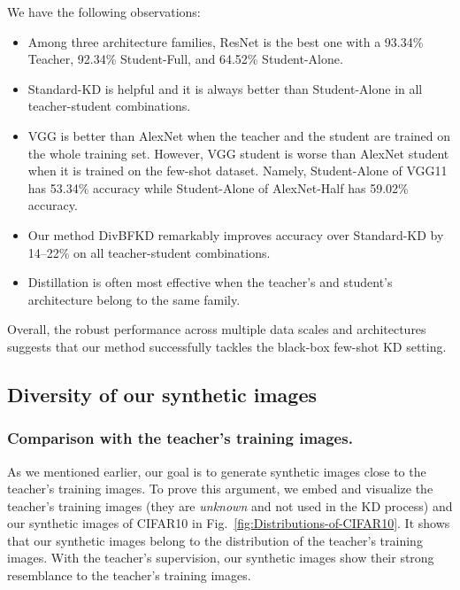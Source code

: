 \documentclass[12pt, a4paper, twoside]{book}
\numberwithin{equation}{chapter}
\theoremstyle{plain}
\theoremstyle{definition}
\theoremstyle{remark}
\newenvironment{foldable}{}{}
\begin{document}
\begin{foldable}
  We have the following observations:
  \begin{itemize}
    \item Among three architecture families, ResNet is the best one with a 93.34\% Teacher, 92.34\% Student-Full, and 64.52\% Student-Alone.
    \item Standard-KD is helpful and it is always better than Student-Alone in all teacher-student combinations.
    \item {
        VGG is better than AlexNet when the teacher and the student are trained on the whole training set.
        However, VGG student is worse than AlexNet student when it is trained on the few-shot dataset.
        Namely, Student-Alone of VGG11 has 53.34\% accuracy while Student-Alone of AlexNet-Half has 59.02\% accuracy.
      }
    \item Our method DivBFKD remarkably improves accuracy over Standard-KD by 14--22\% on all teacher-student combinations.
    \item Distillation is often most effective when the teacher's and student's architecture belong to the same family.
  \end{itemize}
  Overall, the robust performance across multiple data scales and architectures suggests that our method successfully tackles the black-box few-shot \ac{KD} setting.
\end{foldable}

\subsection{Diversity of our synthetic images}

\subsubsection{Comparison with the teacher's training images.}

\begin{foldable}
  As we mentioned earlier, our goal is to generate synthetic images close to the teacher's training images.
  To prove this argument, we embed and visualize the teacher's training images (they are \textit{unknown} and not used in the \ac{KD} process) and our synthetic images of CIFAR10 in Fig.~\ref{fig:Distributions-of-CIFAR10}.
  It shows that our synthetic images belong to the distribution of the teacher's training images.
  With the teacher's supervision, our synthetic images show their strong resemblance to the teacher's training images.
\end{foldable}
\end{document}
